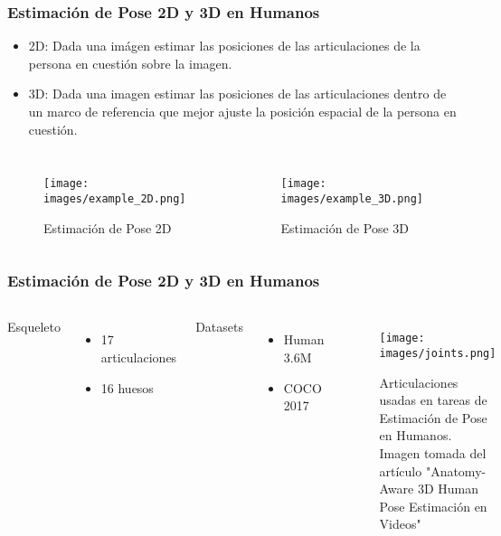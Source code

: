 \documentclass{beamer}
\begin{document}
\begin{frame}
\frametitle{Estimación de Pose 2D y 3D en Humanos}

\begin{itemize}
    \item 2D: Dada una imágen estimar las posiciones de las articulaciones de la persona en cuestión
          sobre la imagen.
    \item 3D: Dada una imagen estimar las posiciones de las articulaciones dentro de un marco de
          referencia que mejor ajuste la posición espacial de la persona en cuestión.
\end{itemize}

\begin{columns}
\begin{figure}[htbp]
    \centerline{\texttt{[image: images/example\_2D.png]}}
    \caption{Estimación de Pose 2D}
    \label{fig:ie2d}
\end{figure}

\begin{figure}[htbp]
    \centerline{\texttt{[image: images/example\_3D.png]}}
    \caption{Estimación de Pose 3D}
    \label{fig:ie3d}
\end{figure}
\end{columns}
\end{frame}


\begin{frame}
\frametitle{Estimación de Pose 2D y 3D en Humanos}

\begin{columns}

Esqueleto
\begin{itemize}
    \item 17 articulaciones
    \item 16 huesos \\~\
\end{itemize}

Datasets
\begin{itemize}
    \item Human 3.6M
    \item COCO 2017
\end{itemize}

\begin{figure}[htbp]
    \centerline{\texttt{[image: images/joints.png]}}
    \caption{Articulaciones usadas en tareas de Estimación de Pose en Humanos. Imagen tomada del
    artículo "Anatomy-Aware 3D Human Pose Estimación en Videos"}
    \label{fig:joints}
\end{figure}

\end{columns}

\end{frame}
\end{document}
